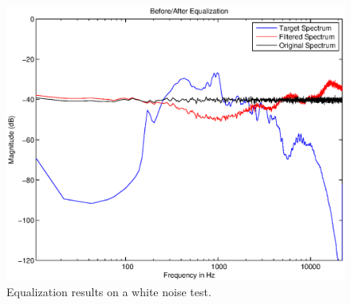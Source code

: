 \documentclass{article}
\begin{document}
\begin{figure}[htbp]
\centering
\includegraphics[width=0.9\columnwidth]{whitenoise.eps}
\caption{Equalization results on a white noise test.}
\label{fig:whitenoise}
\end{figure}



\end{document}

